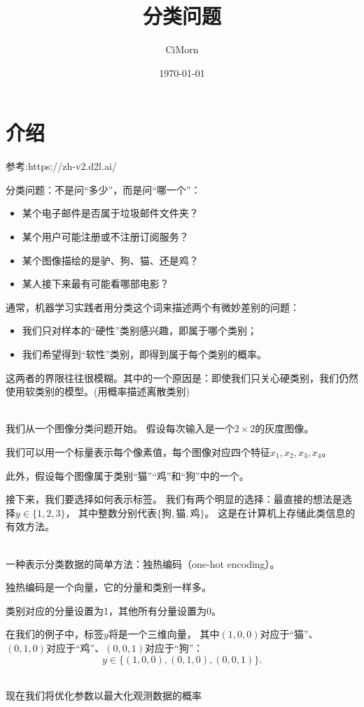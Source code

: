 \documentclass[openany,11pt]{book}
\title{分类问题}
\author{CiMorn}
\date{\today}
\begin{document}
\maketitle

\chapter{介绍}
参考:https://zh-v2.d2l.ai/

分类问题：不是问“多少”，而是问“哪一个”：
\begin{itemize}
	\item  某个电子邮件是否属于垃圾邮件文件夹？
	\item  某个用户可能注册或不注册订阅服务？
	\item  某个图像描绘的是驴、狗、猫、还是鸡？
	\item  某人接下来最有可能看哪部电影？
\end{itemize}
通常，机器学习实践者用分类这个词来描述两个有微妙差别的问题：
\begin{itemize}
	\item 我们只对样本的“硬性”类别感兴趣，即属于哪个类别；
	\item 我们希望得到“软性”类别，即得到属于每个类别的概率。
\end{itemize}
这两者的界限往往很模糊。其中的一个原因是：即使我们只关心硬类别，我们仍然使用软类别的模型。(用概率描述离散类别)

~\\
我们从一个图像分类问题开始。{\color{red} 假设每次输入是一个$2\times2$的灰度图像。}

我们可以用一个标量表示每个像素值，每个图像对应四个特征$x_1, x_2, x_3, x_4$。

此外，假设每个图像属于类别“猫”“鸡”和“狗”中的一个。

接下来，我们要选择如何表示标签。
我们有两个明显的选择：最直接的想法是选择$y \in \{1, 2, 3\}$，
其中整数分别代表$\{\text{狗}, \text{猫}, \text{鸡}\}$。
这是在计算机上存储此类信息的有效方法。

~\\
{\color{red} 一种表示分类数据的简单方法：独热编码（one-hot encoding）。}

独热编码是一个向量，它的分量和类别一样多。

类别对应的分量设置为1，其他所有分量设置为0。

在我们的例子中，标签$y$将是一个三维向量，
其中$(1, 0, 0)$对应于“猫”、$(0, 1, 0)$对应于“鸡”、$(0, 0, 1)$对应于“狗”：
$$y \in \{(1, 0, 0), (0, 1, 0), (0, 0, 1)\}.$$


~\\
{\color{red} 现在我们将优化参数以最大化观测数据的概率}
\end{document}
